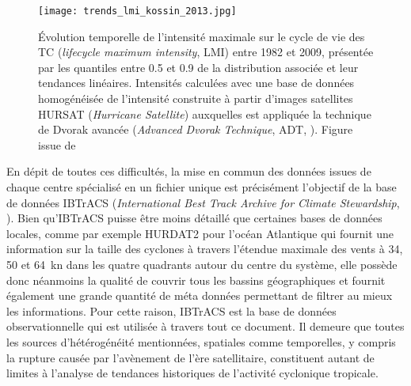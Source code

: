 \documentclass[../main.tex]{subfiles}
\begin{document}
\begin{figure}[tb]
    \centering
    \texttt{[image: trends\_lmi\_kossin\_2013.jpg]}
    \caption{Évolution temporelle de l'intensité maximale sur le cycle de vie des TC (\textit{lifecycle maximum intensity}, LMI) entre 1982 et 2009, présentée
        par les quantiles entre \num{0.5} et \num{0.9} de la distribution associée et leur tendances linéaires. Intensités calculées avec une base de données
        homogénéisée de l'intensité construite à partir d'images satellites \hbox{HURSAT} (\textit{Hurricane Satellite}) auxquelles est appliquée la technique
        de Dvorak avancée (\textit{Advanced Dvorak Technique}, ADT, \cite{olander_advanced_2007}). Figure issue de \hbox{\cite{kossin_trend_2013}}}
    \label{fig:observed_trends_lmi}
\end{figure}

En dépit de toutes ces difficultés, la mise en commun des données issues de chaque centre spécialisé en un fichier unique est précisément l'objectif de la base
de données IBTrACS (\textit{International Best Track Archive for Climate Stewardship}, \cite{knapp_international_2010}). Bien qu'IBTrACS puisse être moins
détaillé que certaines bases de données locales, comme par exemple HURDAT2 pour l'océan Atlantique \parencite{landsea_atlantic_2013} qui fournit une information
sur la taille des cyclones à travers l'étendue maximale des vents à \num{34}, \num{50} et \SI{64}{\knot} dans les quatre quadrants autour du centre du système,
elle possède donc néanmoins la qualité de couvrir tous les bassins géographiques et fournit également une grande quantité de méta données permettant de filtrer
au mieux les informations. Pour cette raison, IBTrACS est la base de données observationnelle qui est utilisée à travers tout ce document. Il demeure que toutes
les sources d'hétérogénéité mentionnées, spatiales comme temporelles, y compris la rupture causée par l'avènement de l'ère satellitaire, constituent autant de
limites à l'analyse de tendances historiques de l'activité cyclonique tropicale.
\end{document}

